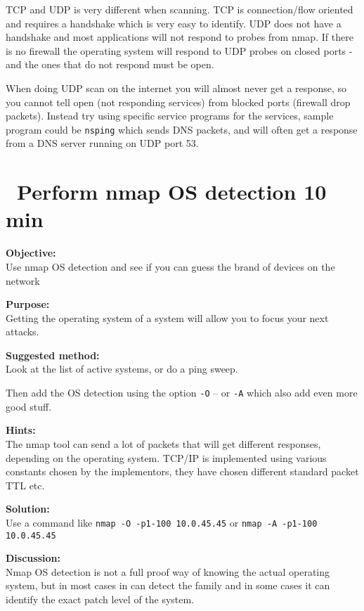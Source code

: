\documentclass[a4paper,11pt,notitlepage]{report}
\begin{document}
TCP and UDP is very different when scanning. TCP is connection/flow oriented and requires a handshake which is very easy to identify. UDP does not have a handshake and most applications will not respond to probes from nmap. If there is no firewall the operating system will respond to UDP probes on closed ports - and the ones that do not respond must be open.

When doing UDP scan on the internet you will almost never get a response, so you cannot tell open (not responding services) from blocked ports (firewall drop packets). Instead try using specific service programs for the services, sample program could be \verb+nsping+ which sends DNS packets, and will often get a response from a DNS server running on UDP port 53.

\chapter{\faInfoCircle\ Perform nmap OS detection 10 min}
\label{ex:nmap-os}

{\bf Objective:} \\
Use nmap OS detection and see if you can guess the brand of devices on the network

{\bf Purpose:}\\
Getting the operating system of a system will allow you to focus your next attacks.

{\bf Suggested method:}\\
Look at the list of active systems, or do a ping sweep.

Then add the OS detection using the option \verb+-O+ -- or \verb+-A+ which also add even more good stuff.



{\bf Hints:} \\
The nmap tool can send a lot of packets that will get different responses, depending on the operating system. TCP/IP is implemented using various constants chosen by the implementors, they have chosen different standard packet TTL etc.

{\bf Solution:}\\
Use a command like \verb+nmap -O -p1-100 10.0.45.45+ or  \verb+nmap -A -p1-100 10.0.45.45+


{\bf Discussion:}\\
Nmap OS detection is not a full proof way of knowing the actual operating system, but in most cases in can detect the family and in some cases it can identify the exact patch level of the system.
\end{document}
